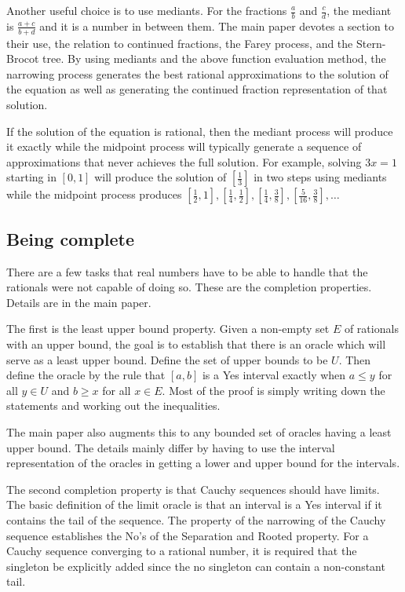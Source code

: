 \documentclass[12pt]{article}
\theoremstyle{remark}
\begin{document}
Another useful choice is to use mediants. For the fractions $\frac{a}{b}$ and $\frac{c}{d}$, the mediant is $\frac{a+c}{b+d}$ and it is a number in between them. The main paper devotes a section to their use, the relation to continued fractions, the Farey process, and the Stern-Brocot tree. By using mediants and the above function evaluation method, the narrowing process generates the best rational approximations to the solution of the equation as well as generating the continued fraction representation of that solution. 

If the solution of the equation is rational, then the mediant process will produce it exactly while the midpoint process will typically generate a sequence of approximations that never achieves the full solution. For example, solving $3x = 1$ starting in $[0,1]$ will produce the solution of $[\frac{1}{3}]$ in two steps using mediants while the midpoint process produces $[\frac{1}{2}, 1], [\frac{1}{4}, \frac{1}{2}], [\frac{1}{4}, \frac{3}{8}], [\frac{5}{16}, \frac{3}{8}], \ldots$
 

\subsection{Being complete}

There are a few tasks that real numbers have to be able to handle that the rationals were not capable of doing so. These are the completion properties. Details are in the main paper.

The first is the least upper bound property. Given a non-empty set $E$ of rationals with an upper bound, the goal is  to establish that there is an oracle which will serve as a least upper bound. Define the set of upper bounds to be $U$. Then define the oracle by the rule that $[a,b]$ is a Yes interval exactly when $a\leq y$ for all $y \in U$ and $b\geq x$ for all $x\in E$. Most of the proof is simply writing down the statements and working out the inequalities. 

The main paper also augments this to any bounded set of oracles having a least upper bound. The details mainly differ by having to use the interval representation of the oracles in getting a lower and upper bound for the intervals. 

The second completion property is that Cauchy sequences should have limits. The basic definition of the limit oracle is that an interval is a Yes interval if it contains the tail of the sequence. The property of the narrowing of the Cauchy sequence establishes the No's of the Separation and Rooted property. For a Cauchy sequence converging to a rational number, it is required that the singleton be explicitly added since the no singleton can contain a non-constant tail.
\end{document}
